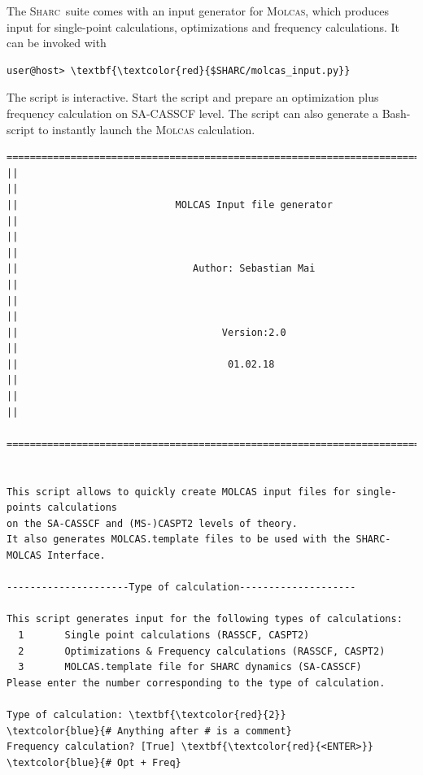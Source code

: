 \documentclass[a4paper,11pt,DIV=15,openany]{scrbook}
\newcommand{\sharc}{\textsc{Sharc}}
\begin{document}
The \sharc\ suite comes with an input generator for \textsc{Molcas}, which produces input for single-point calculations, optimizations and frequency calculations. 
It can be invoked with
\begin{Verbatim}[commandchars=\\\{\}]
user@host> \textbf{\textcolor{red}{$SHARC/molcas_input.py}}
\end{Verbatim}
The script is interactive. 
Start the script and prepare an optimization plus frequency calculation on SA-CASSCF level. 
The script can also generate a Bash-script to instantly launch the \textsc{Molcas} calculation.

\begin{oframed}
\footnotesize\begin{Verbatim}[commandchars=\\\{\}]
  ================================================================================
||                                                                                ||
||                           MOLCAS Input file generator                          ||
||                                                                                ||
||                              Author: Sebastian Mai                             ||
||                                                                                ||
||                                   Version:2.0                                  ||
||                                    01.02.18                                    ||
||                                                                                ||
  ================================================================================


This script allows to quickly create MOLCAS input files for single-points calculations
on the SA-CASSCF and (MS-)CASPT2 levels of theory. 
It also generates MOLCAS.template files to be used with the SHARC-MOLCAS Interface.
  
---------------------Type of calculation--------------------

This script generates input for the following types of calculations:
  1       Single point calculations (RASSCF, CASPT2)
  2       Optimizations & Frequency calculations (RASSCF, CASPT2)
  3       MOLCAS.template file for SHARC dynamics (SA-CASSCF)
Please enter the number corresponding to the type of calculation.

Type of calculation: \textbf{\textcolor{red}{2}}                       \textcolor{blue}{# Anything after # is a comment}
Frequency calculation? [True] \textbf{\textcolor{red}{<ENTER>}}        \textcolor{blue}{# Opt + Freq}


\end{Verbatim}
\end{oframed}
\end{document}
